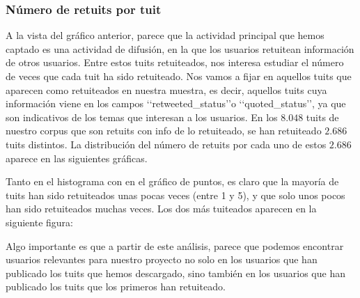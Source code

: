 
\subsubsection{Número de retuits por tuit}
A la vista del gráfico anterior, parece que la actividad principal que hemos captado es
una actividad de difusión, en la que los usuarios retuitean información de otros usuarios.
Entre estos tuits retuiteados, nos interesa estudiar el número de veces que 
cada tuit ha sido retuiteado. Nos vamos a fijar en aquellos tuits que aparecen como retuiteados en nuestra muestra, es decir, aquellos tuits cuya información viene en los campos \lq\lq retweeted\_status\rq\rq o \lq\lq quoted\_status\rq\rq,
ya que son indicativos de los temas que interesan a los usuarios.
En los $8.048$ tuits de nuestro corpus que son retuits con info de lo retuiteado, se han retuiteado $2.686$ tuits distintos. La distribución del número de retuits por cada uno de estos $2.686$ aparece en las siguientes
gráficas.


Tanto en el histograma con en el gráfico de puntos, es claro que la mayoría de tuits han sido retuiteados unas pocas
veces (entre 1 y 5), y que solo unos pocos han sido retuiteados muchas veces. Los dos más tuiteados aparecen en la siguiente figura:


Algo importante es que a partir de este análisis, parece que podemos encontrar usuarios relevantes 
para nuestro proyecto no solo en los usuarios que han publicado los tuits que hemos descargado, 
sino también en los usuarios que han publicado los tuits que los primeros han retuiteado.

